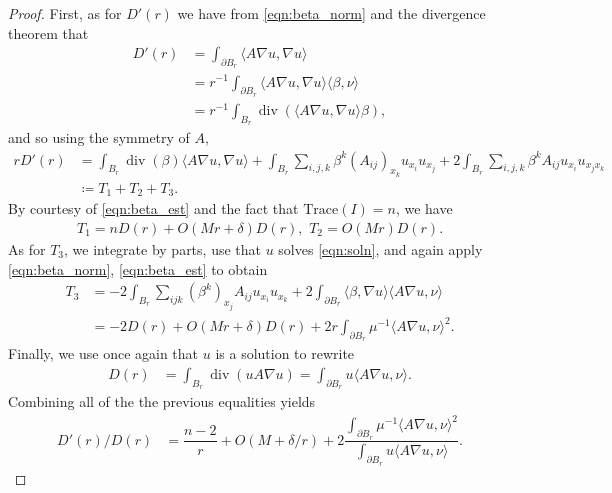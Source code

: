 \documentclass[12pt,leqno]{amsart}
\numberwithin{equation}{section}
\theoremstyle{definition}
\DeclareMathOperator{\divv}{\mathrm{div}}
\begin{document}
\begin{proof}
		First, as for $D'(r)$ we have from \eqref{eqn:beta_norm} and the divergence theorem that
		\begin{align*}
			D'(r) & = \int_{\partial B_r} \langle A \nabla u, \nabla u \rangle \\
			& = r^{-1} \int_{\partial B_r} \langle A \nabla u, \nabla u \rangle \langle \beta, \nu \rangle  \\
			& = r^{-1} \int_{B_r} \divv( \langle A \nabla u, \nabla u \rangle \beta ) ,
		\end{align*}
		and so using the symmetry of $A$,
		\begin{align*}
			rD'(r) & = \int_{B_r} \divv(\beta) \langle A \nabla u, \nabla u \rangle + \int_{B_r} \sum_{i,j,k} \beta^k (A_{ij})_{x_k} u_{x_i} u_{x_j} + 2 \int_{B_r} \sum_{i,j,k} \beta^k  A_{ij} u_{x_i} u_{x_j x_k} \\
			& \coloneqq T_1 + T_2 + T_3.
		\end{align*}
		By courtesy of \eqref{eqn:beta_est} and the fact that $\mathrm{Trace}(I) = n$, we have
		\begin{align*}
			T_1 = n D(r) + O(M r + \delta) D(r) , \,\, T_2 = O(M r) D(r).
		\end{align*}
		As for $T_3$, we integrate by parts, use that $u$ solves \eqref{eqn:soln}, and again apply \eqref{eqn:beta_norm}, \eqref{eqn:beta_est} to obtain 
		\begin{align*}
			T_3 & = -2 \int_{B_r} \sum_{ijk} (\beta^k)_{x_j} A_{ij} u_{x_i} u_{x_k} + 2 \int_{\partial B_r} \langle \beta, \nabla u \rangle \langle A \nabla u, \nu \rangle \\
			& = -2 D(r) + O(Mr + \delta) D(r) + 2r \int_{\partial B_r} \mu^{-1} \langle A \nabla u, \nu \rangle^2 .
		\end{align*}
		Finally, we use once again that $u$ is a solution to rewrite
		\begin{align}\label{eqn:D}
			D(r) & = \int_{B_r} \divv(u A \nabla u)  = \int_{\partial B_r} u \langle A \nabla u, \nu\rangle. 
		\end{align}
		Combining all of the the previous equalities yields
		\begin{align}\label{eqn:D'}
			D'(r)/D(r) & = \dfrac{n-2}{r} + O(M + \delta/r) + 2 \dfrac{ \int_{\partial B_r} \mu^{-1} \langle A \nabla u, \nu \rangle^2  }{  \int_{\partial B_r} u \langle A \nabla u, \nu \rangle   }.
		\end{align} 
		

\end{proof}
\end{document}
